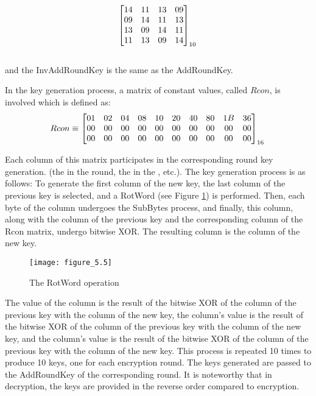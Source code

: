 \begin{equation} \label{eq:invmixcolumns}
\begin{bmatrix}
14 & 11 & 13 & 09 \\
09 & 14 & 11 & 13 \\
13 & 09 & 14 & 11 \\
11 & 13 & 09 & 14 \\
\end{bmatrix}_{10}\\
\end{equation}\\

\noindent
and the InvAddRoundKey is the same as the AddRoundKey.

In the key generation process, a matrix of constant values, called $Rcon$, is involved which is defined as: \\

\begin{equation} \label{eq:rcon}
    Rcon \equiv \begin{bmatrix}
01 & 02 & 04 & 08 & 10 & 20 & 40 & 80 & 1B & 36 \\
00 & 00 & 00 & 00 & 00 & 00 & 00 & 00 & 00 & 00 \\
00 & 00 & 00 & 00 & 00 & 00 & 00 & 00 & 00 & 00 \\
\end{bmatrix}_{16}\\
\end{equation}

\noindent
Each column of this matrix participates in the corresponding round key generation. (the  in the  round, the  in the , etc.).
The key generation process is as follows:
To generate the first column of the new key, the last column of the previous key is selected, and a RotWord (see Figure \ref{fig:figure_5.5}) is performed. Then, each byte of the column undergoes the SubBytes process, and finally, this column, along with the  column of the previous key and the corresponding column of the Rcon matrix, undergo bitwise XOR. The resulting column is the  column of the new key.

\begin{figure}
\centering
\texttt{[image: figure\_5.5]}\\
\caption{ The RotWord operation}
\label{fig:figure_5.5}
\end{figure}


The value of the  column is the result of the bitwise XOR of the  column of the previous key with the  column of the new key, the  column's value is the result of the bitwise XOR of the  column of the previous key with the  column of the new key, and the  column's value is the result of the bitwise XOR of the  column of the previous key with the  column of the new key. This process is repeated 10 times to produce 10 keys, one for each encryption round. The keys generated are passed to the AddRoundKey of the corresponding round. It is noteworthy that in decryption, the keys are provided in the reverse order compared to encryption.


